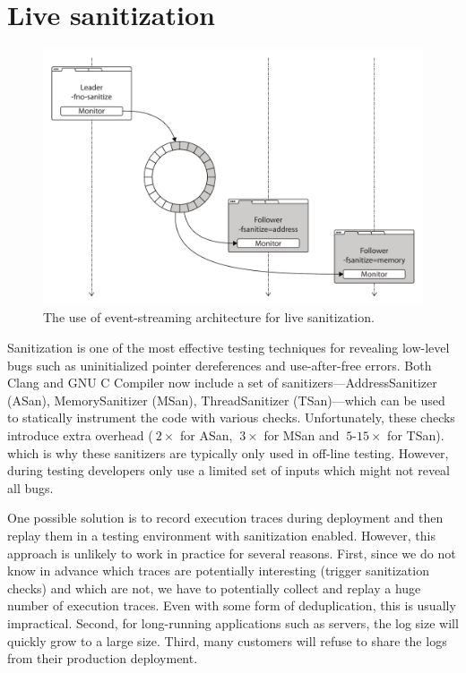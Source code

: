 \section{Live sanitization}
\label{sec:sanitization}

\begin{figure}[t]
  \begin{center}
    \includegraphics[width=0.75\columnwidth]{applications/figures/live-sanitization}
    \caption{The use of event-streaming architecture for live sanitization.}
    \label{fig:live-sanitization}
  \end{center}
\end{figure}

Sanitization is one of the most effective testing techniques for revealing
low-level bugs such as uninitialized pointer dereferences and use-after-free
errors.  Both Clang and GNU C Compiler now include a set of
sanitizers---AddressSanitizer (ASan), MemorySanitizer (MSan), ThreadSanitizer
(TSan)---which can be used to statically instrument the code with various
checks.  Unfortunately, these checks introduce extra overhead (\eg $~2\times$
for ASan, $~3\times$ for MSan and $~5$-$15\times$ for TSan).  which is why
these sanitizers are typically only used in off-line testing. However, during
testing developers only use a limited set of inputs which might not reveal all
bugs.

One possible solution is to record execution traces during deployment and then
replay them in a testing environment with sanitization enabled. However, this
approach is unlikely to work in practice for several reasons. First, since we
do not know in advance which traces are potentially interesting (\eg trigger
sanitization checks) and which are not, we have to potentially collect and
replay a huge number of execution traces. Even with some form of deduplication,
this is usually impractical. Second, for long-running applications such as
servers, the log size will quickly grow to a large size. Third, many customers
will refuse to share the logs from their production deployment.

